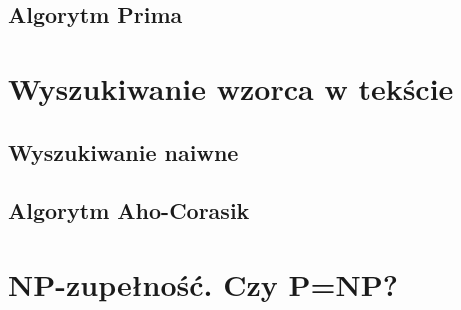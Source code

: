 \documentclass[10pt, oneside]{article}
\theoremstyle{remark}
\begin{document}
\subsection{Algorytm Prima}

\section{Wyszukiwanie wzorca w tekście}

\subsection{Wyszukiwanie naiwne}

\subsection{Algorytm Aho-Corasik}

\section{NP-zupełność. Czy P=NP?}
\end{document}

